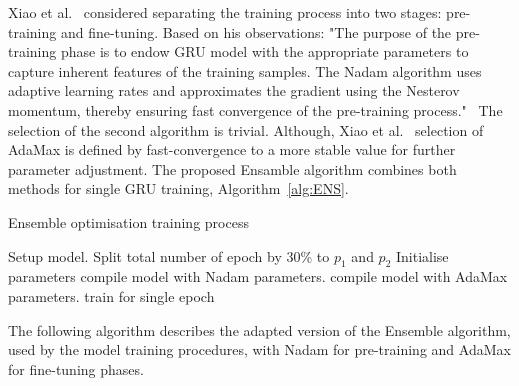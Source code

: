 %
%
Xiao et al.~\cite{xiao_accurate_2019} considered separating the training process into two stages: pre-training and fine-tuning.
Based on his observations: "The purpose of the pre-training phase is to endow GRU model with the appropriate parameters to capture inherent features of the training samples.
The Nadam algorithm uses adaptive learning rates and approximates the gradient using the Nesterov momentum, thereby ensuring fast convergence of the pre-training process."~\cite{xiao_accurate_2019}
The selection of the second algorithm is trivial.
Although, Xiao et al.~\cite{xiao_accurate_2019} selection of AdaMax is defined by fast-convergence to a more stable value for further parameter adjustment.
The proposed Ensamble algorithm combines both methods for single GRU training, \mbox{Algorithm~\ref{alg:ENS}}.
\begin{algorithm}
    \caption{Ensemble optimisation training process}
        \begin{algorithmic}[1]
            \STATE Setup model. Split total number of epoch by 30\% to $p_{1}$ and $p_{2}$
            \STATE Initialise parameters
                    \STATE {}
                    \STATE compile model with Nadam parameters. 
                \ELSE
                    \STATE {}
                    \STATE compile model with AdaMax parameters. 
                \ENDIF
                \STATE train for single epoch
            \ENDWHILE
        \end{algorithmic}
    \label{alg:ENS}
\end{algorithm}
The following algorithm describes the adapted version of the Ensemble algorithm, used by the model training procedures, with Nadam for pre-training and AdaMax for fine-tuning phases.

